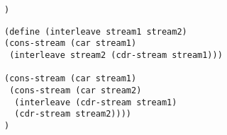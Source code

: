 \documentclass{exam}
\begin{document}
\begin{questions}
\begin{blocksection}
\begin{lstlisting}
)
\end{lstlisting}

\begin{solution}
\begin{lstlisting}
(define (interleave stream1 stream2)
(cons-stream (car stream1) 
 (interleave stream2 (cdr-stream stream1)))

(cons-stream (car stream1)
 (cons-stream (car stream2)
  (interleave (cdr-stream stream1)
  (cdr-stream stream2))))
)
\end{lstlisting}
\end{solution}
\end{blocksection}


\end{questions}


\end{document}
